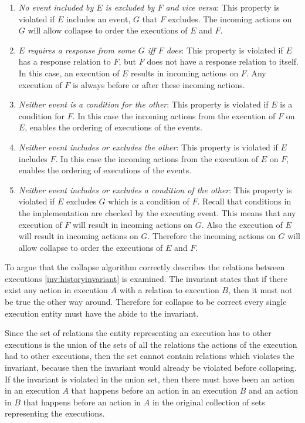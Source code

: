 	\begin{enumerate}
		\item \textit{No event included by $E$ is excluded by $F$ and vice versa}: This property is violated if $E$ includes an event, $G$ that $F$ excludes. The incoming actions on $G$ will allow collapse to order the executions of $E$ and $F$.
		\item \textit{$E$ requires a response from some $G$ iff $F$ does}: This property is violated if $E$ has a response relation to $F$, but $F$ does not have a response relation to itself. In this case, an execution of $E$ results in incoming actions on $F$. Any execution of $F$ is always before or after these incoming actions.
		\item \textit{Neither event is a condition for the other}: This property is violated if $E$ is a condition for $F$. In this case the incoming actions from the execution of $F$ on $E$, enables the ordering of executions of the events.
		\item \textit{Neither event includes or excludes the other}: This property is violated if $E$ includes $F$. In this case the incoming actions from the execution of $E$ on $F$, enables the ordering of executions of the events.
		\item \textit{Neither event includes or excludes a condition of the other}: This property is violated if $E$ excludes $G$ which is a condition of $F$. Recall that conditions in the implementation are checked by the executing event. This means that any execution of $F$ will result in incoming actions on $G$. Also the execution of $E$ will result in incoming actions on $G$. Therefore the incoming actions on $G$ will allow collapse to order the executions of $E$ and $F$.
	\end{enumerate}
	
	To argue that the collapse algorithm correctly describes the relations between executions \autoref{inv:historyinvariant} is examined. The invariant states that if there exist any action in execution $A$ with a relation to execution $B$, then it must not be true the other way around. Therefore for collapse to be correct every single execution entity must have the abide to the invariant. 
	
	Since the set of relations the entity representing an execution has to other executions is the union of the sets of all the relations the actions of the execution had to other executions, then the set cannot contain relations which violates the invariant, because then the invariant would already be violated before collapsing. If the invariant is violated in the union set, then there must have been an action in an execution $A$ that happens before an action in an execution $B$ and an action in $B$ that happens before an action in $A$ in the original collection of sets representing the executions.
	
